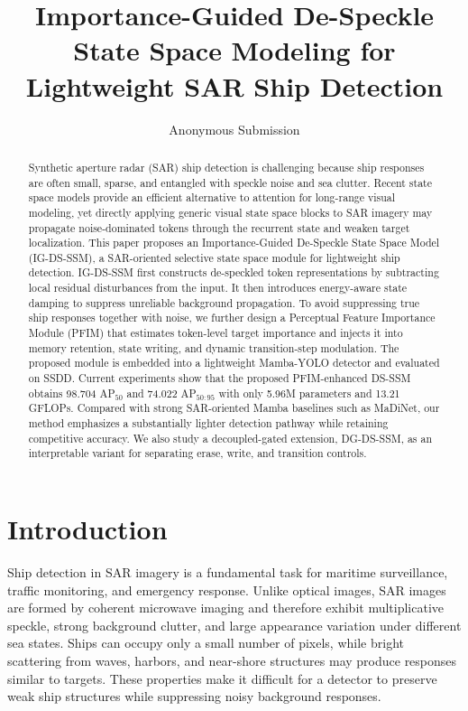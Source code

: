 \documentclass[letterpaper]{article}
\title{Importance-Guided De-Speckle State Space Modeling for Lightweight SAR Ship Detection}
\author{
Anonymous Submission
}
\begin{document}
\maketitle

\begin{abstract}
Synthetic aperture radar (SAR) ship detection is challenging because ship responses are often small, sparse, and entangled with speckle noise and sea clutter. Recent state space models provide an efficient alternative to attention for long-range visual modeling, yet directly applying generic visual state space blocks to SAR imagery may propagate noise-dominated tokens through the recurrent state and weaken target localization. This paper proposes an Importance-Guided De-Speckle State Space Model (IG-DS-SSM), a SAR-oriented selective state space module for lightweight ship detection. IG-DS-SSM first constructs de-speckled token representations by subtracting local residual disturbances from the input. It then introduces energy-aware state damping to suppress unreliable background propagation. To avoid suppressing true ship responses together with noise, we further design a Perceptual Feature Importance Module (PFIM) that estimates token-level target importance and injects it into memory retention, state writing, and dynamic transition-step modulation. The proposed module is embedded into a lightweight Mamba-YOLO detector and evaluated on SSDD. Current experiments show that the proposed PFIM-enhanced DS-SSM obtains 98.704 AP$_{50}$ and 74.022 AP$_{50:95}$ with only 5.96M parameters and 13.21 GFLOPs. Compared with strong SAR-oriented Mamba baselines such as MaDiNet, our method emphasizes a substantially lighter detection pathway while retaining competitive accuracy. We also study a decoupled-gated extension, DG-DS-SSM, as an interpretable variant for separating erase, write, and transition controls.
\end{abstract}

\section{Introduction}

Ship detection in SAR imagery is a fundamental task for maritime surveillance, traffic monitoring, and emergency response. Unlike optical images, SAR images are formed by coherent microwave imaging and therefore exhibit multiplicative speckle, strong background clutter, and large appearance variation under different sea states. Ships can occupy only a small number of pixels, while bright scattering from waves, harbors, and near-shore structures may produce responses similar to targets. These properties make it difficult for a detector to preserve weak ship structures while suppressing noisy background responses.
\end{document}

